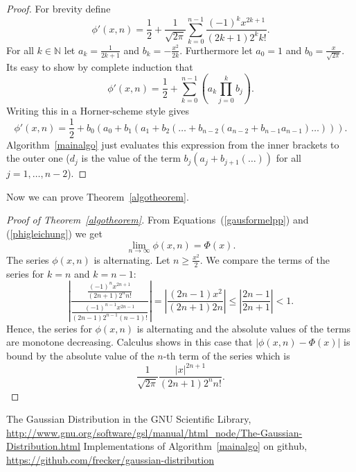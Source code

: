 \documentclass{article}
\newcommand\Nset{\mathbb N}
\begin{document}
\begin{proof}
For brevity define
\[\phi'(x,n)=\frac{1}{2}+\frac{1}{\sqrt{2\pi}}\sum_{k=0}^{n-1}\frac{(-1)^kx^{2k+1}}{(2k+1)2^kk!}.\]
For all $k\in\Nset$ let $a_k=\frac{1}{2k+1}$ and
$b_k=-\frac{x^2}{2k}$. Furthermore let $a_0=1$ and
$b_0=\frac{x}{\sqrt{2\pi}}$. Its easy to show by complete induction that
\[\phi'(x,n)=\frac{1}{2}+\sum_{k=0}^{n-1}\left(a_k\prod_{j=0}^kb_j\right).\]
Writing this in a Horner-scheme style gives
\[\phi'(x,n)=\frac{1}{2}+b_0\left(a_0+b_1\left(a_1+b_2\left(\dots+b_{n-2}\left(a_{n-2}+b_{n-1}a_{n-1}\right)\dots\right)\right)\right).\]
Algorithm~\ref{mainalgo} just evaluates this expression from the inner
brackets to the outer one ($d_j$ is the value of the term
$b_j(a_j+b_{j+1}(\dots))$ for all $j=1,\dots,n-2$).
\end{proof}

Now we can prove Theorem~\ref{algotheorem}.

\begin{proof}[Proof of Theorem~\ref{algotheorem}]
From Equations~(\ref{gausformelpp}) and (\ref{phigleichung}) we get
\[\lim_{n\to\infty}\phi(x,n)=\Phi(x).\]
The series $\phi(x,n)$ is alternating. Let $n\ge\frac{x^2}{2}$. We
compare the terms of the series for $k=n$ and $k=n-1$:
\[\left|\frac{\frac{(-1)^nx^{2n+1}}{(2n+1)2^nn!}}{\frac{(-1)^{n-1}x^{2n-1}}{(2n-1)2^{n-1}(n-1)!}}\right|%
=\left|\frac{(2n-1)x^2}{(2n+1)2n}\right|\le\left|\frac{2n-1}{2n+1}\right|<1.\]
Hence, the series for $\phi(x,n)$ is alternating and the absolute
values of the terms are monotone decreasing. Calculus shows
in this case that $|\phi(x,n)-\Phi(x)|$ is bound by the absolute value
of the $n$-th term of the series which is
\[\frac{1}{\sqrt{2\pi}}\frac{|x|^{2n+1}}{(2n+1)2^nn!}.\]
\end{proof}

\begin{thebibliography}{9}
The Gaussian Distribution in the GNU
Scientific Library,
\url{http://www.gnu.org/software/gsl/manual/html\_node/The-Gaussian-Distribution.html}
Implementations of Algorithm~\ref{mainalgo} on github,
\url{https://github.com/frecker/gaussian-distribution}
\end{thebibliography}
\end{document}
